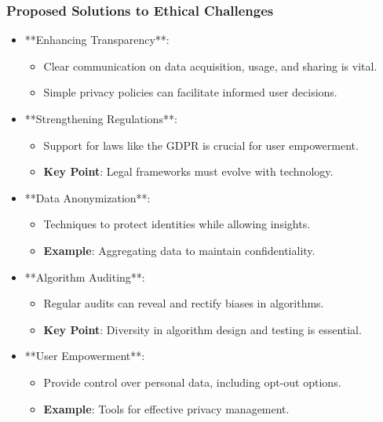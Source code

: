 \documentclass{beamer}
\begin{document}
\begin{frame}[fragile]
    \frametitle{Proposed Solutions to Ethical Challenges}
    \begin{itemize}
        \item **Enhancing Transparency**:
            \begin{itemize}
                \item Clear communication on data acquisition, usage, and sharing is vital.
                \item Simple privacy policies can facilitate informed user decisions.
            \end{itemize}
        \item **Strengthening Regulations**:
            \begin{itemize}
                \item Support for laws like the GDPR is crucial for user empowerment.
                \item \textbf{Key Point}: Legal frameworks must evolve with technology.
            \end{itemize}
        \item **Data Anonymization**:
            \begin{itemize}
                \item Techniques to protect identities while allowing insights.
                \item \textbf{Example}: Aggregating data to maintain confidentiality.
            \end{itemize}
        \item **Algorithm Auditing**:
            \begin{itemize}
                \item Regular audits can reveal and rectify biases in algorithms.
                \item \textbf{Key Point}: Diversity in algorithm design and testing is essential.
            \end{itemize}
        \item **User Empowerment**:
            \begin{itemize}
                \item Provide control over personal data, including opt-out options.
                \item \textbf{Example}: Tools for effective privacy management.
            \end{itemize}
    \end{itemize}
\end{frame}
\end{document}
